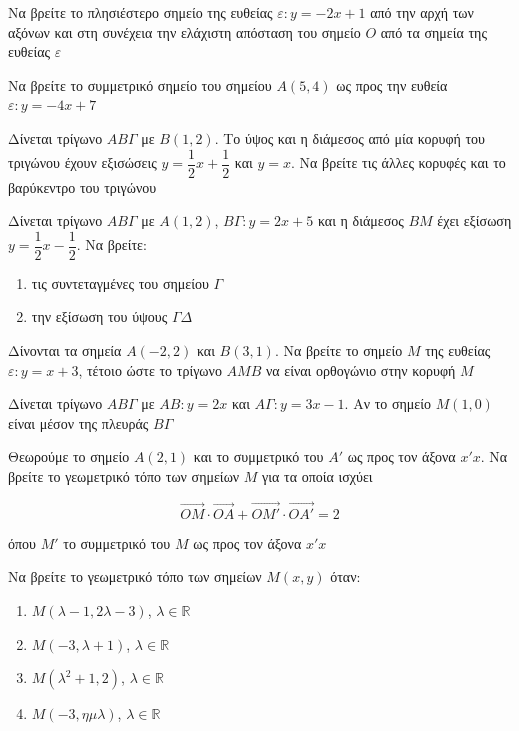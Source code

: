 \documentclass{presentation}
\begin{document}
\begin{askisi}
  Να βρείτε το πλησιέστερο σημείο της ευθείας $ε:y=-2x+1$ από την αρχή των αξόνων και στη συνέχεια την ελάχιστη απόσταση του σημείο $Ο$ από τα σημεία της ευθείας $ε$
\end{askisi}

\begin{askisi}
  Να βρείτε το συμμετρικό σημείο του σημείου $Α(5,4)$ ως προς την ευθεία $ε:y=-4x+7$
\end{askisi}

\begin{askisi}
  Δίνεται τρίγωνο $ΑΒΓ$ με $Β(1,2)$. Το ύψος και η διάμεσος από μία κορυφή του τριγώνου έχουν εξισώσεις $y=\dfrac{1}{2}x+\dfrac{1}{2}$ και $y=x$. Να βρείτε τις άλλες κορυφές και το βαρύκεντρο του τριγώνου
\end{askisi}

\begin{askisi}
  Δίνεται τρίγωνο $ΑΒΓ$ με $Α(1,2)$, $ΒΓ:y=2x+5$ και η διάμεσος $ΒΜ$ έχει εξίσωση $y=\dfrac{1}{2}x-\dfrac{1}{2}$. Να βρείτε:
  \begin{enumerate}[<+->]
    \item τις συντεταγμένες του σημείου $Γ$
    \item την εξίσωση του ύψους $ΓΔ$
  \end{enumerate}
\end{askisi}

\begin{askisi}
  Δίνονται τα σημεία $Α(-2,2)$ και $Β(3,1)$. Να βρείτε το σημείο $Μ$ της ευθείας $ε:y=x+3$, τέτοιο ώστε το τρίγωνο $ΑΜΒ$ να είναι ορθογώνιο στην κορυφή $Μ$
\end{askisi}

\begin{askisi}
  Δίνεται τρίγωνο $ΑΒΓ$ με $ΑΒ:y=2x$ και $ΑΓ:y=3x-1$. Αν το σημείο $Μ(1,0)$ είναι μέσον της πλευράς $ΒΓ$
\end{askisi}

\begin{askisi}
  Θεωρούμε το σημείο $Α(2,1)$ και το συμμετρικό του $Α'$ ως προς τον άξονα $x'x$. Να βρείτε το γεωμετρικό τόπο των σημείων $Μ$ για τα οποία ισχύει

  $$\overrightarrow{ΟΜ}\cdot\overrightarrow{ΟΑ}+\overrightarrow{ΟΜ'}\cdot\overrightarrow{ΟΑ'}=2$$

  όπου $Μ'$ το συμμετρικό του $Μ$ ως προς τον άξονα $x'x$
\end{askisi}

\begin{askisi}
  Να βρείτε το γεωμετρικό τόπο των σημείων $Μ(x,y)$ όταν:
  \begin{enumerate}[<+->]
    \item $Μ(λ-1,2λ-3)$, $λ\in\mathbb{R}$
    \item $Μ(-3,λ+1)$, $λ\in\mathbb{R}$
    \item $Μ(λ^2+1,2)$, $λ\in\mathbb{R}$
    \item $Μ(-3,ημλ)$, $λ\in\mathbb{R}$
  \end{enumerate}
\end{askisi}
\end{document}

